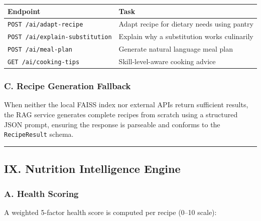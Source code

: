 \documentclass[
  10pt,
]{article}
\begin{document}
\begin{longtable}[]{@{}
  >{\raggedright\arraybackslash}p{}
  >{\raggedright\arraybackslash}p{}@{}}
\toprule\noalign{}
\begin{minipage}[b]{\linewidth}\raggedright
Endpoint
\end{minipage} & \begin{minipage}[b]{\linewidth}\raggedright
Task
\end{minipage} \\
\midrule\noalign{}
\endhead
\bottomrule\noalign{}
\endlastfoot
\texttt{POST\ /ai/adapt-recipe} & Adapt recipe for dietary needs using
pantry \\
\texttt{POST\ /ai/explain-substitution} & Explain why a substitution
works culinarily \\
\texttt{POST\ /ai/meal-plan} & Generate natural language meal plan \\
\texttt{GET\ /ai/cooking-tips} & Skill-level-aware cooking advice \\
\end{longtable}

\subsubsection{C. Recipe Generation
Fallback}\label{c.-recipe-generation-fallback}

When neither the local FAISS index nor external APIs return sufficient
results, the RAG service generates complete recipes from scratch using a
structured JSON prompt, ensuring the response is parseable and conforms
to the \texttt{RecipeResult} schema.

\begin{center}\rule{0.5\linewidth}{0.5pt}\end{center}

\subsection{IX. Nutrition Intelligence
Engine}\label{ix.-nutrition-intelligence-engine}

\subsubsection{A. Health Scoring}\label{a.-health-scoring}

A weighted 5-factor health score is computed per recipe (0--10 scale):
\end{document}
